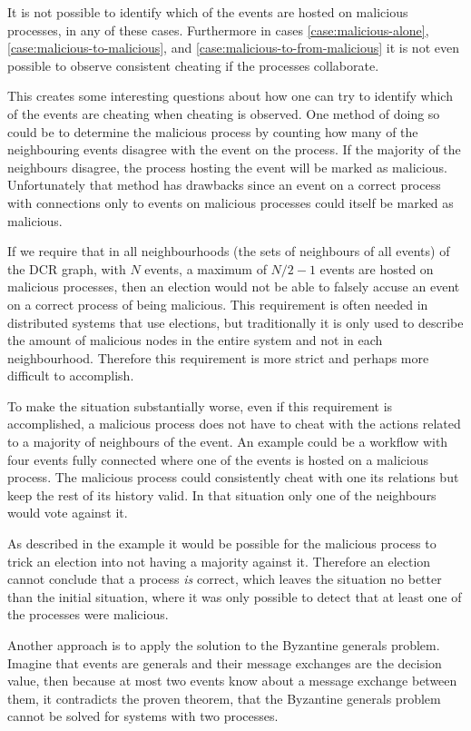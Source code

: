 	\newpar It is not possible to identify which of the events are hosted on malicious processes, in any of these cases. Furthermore in cases \ref{case:malicious-alone}, \ref{case:malicious-to-malicious}, and \ref{case:malicious-to-from-malicious} it is not even possible to observe consistent cheating if the processes collaborate.
	
	\newpar This creates some interesting questions about how one can try to identify which of the events are cheating when cheating is observed. One method of doing so could be to determine the malicious process by counting how many of the neighbouring events disagree with the event on the process. If the majority of the neighbours disagree, the process hosting the event will be marked as malicious. Unfortunately that method has drawbacks since an event on a correct process with connections only to events on malicious processes could itself be marked as malicious. 
	
	If we require that in all neighbourhoods (the sets of neighbours of all events) of the DCR graph, with $N$ events, a maximum of $N/2-1$ events are hosted on malicious processes, then an election would not be able to falsely accuse an event on a correct process of being malicious. This requirement is often needed in distributed systems that use elections, but traditionally it is only used to describe the amount of malicious nodes in the entire system and not in each neighbourhood. Therefore this requirement is more strict and perhaps more difficult to accomplish.
	
	To make the situation substantially worse, even if this requirement is accomplished, a malicious process does not have to cheat with the actions related to a majority of neighbours of the event. An example could be a workflow with four events fully connected where one of the events is hosted on a malicious process. The malicious process could consistently cheat with one its relations but keep the rest of its history valid. In that situation only one of the neighbours would vote against it. 
	
	As described in the example it would be possible for the malicious process to trick an election into not having a majority against it. Therefore an election cannot conclude that a process \textit{is} correct, which leaves the situation no better than the initial situation, where it was only possible to detect that at least one of the processes were malicious.
	
	\newpar Another approach is to apply the solution to the Byzantine generals problem. Imagine that events are generals and their message exchanges are the decision value, then because at most two events know about a message exchange between them, it contradicts the proven theorem, that the Byzantine generals problem cannot be solved for systems with two processes.
	
